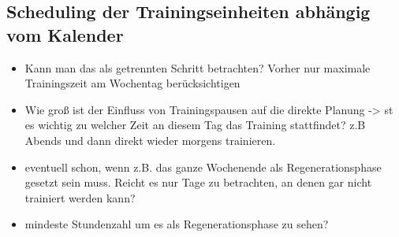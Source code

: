 \subsection{Scheduling der Trainingseinheiten abhängig vom Kalender}
    \begin{itemize}
        \item Kann man das als getrennten Schritt betrachten? Vorher nur maximale Trainingszeit am Wochentag berücksichtigen
        \item Wie groß ist der Einfluss von Trainingspausen auf die direkte Planung -> st es wichtig zu welcher Zeit an diesem Tag das Training stattfindet? z.B Abends und dann direkt wieder morgens trainieren. 
        \item eventuell schon, wenn z.B. das ganze Wochenende als Regenerationsphase gesetzt sein muss. Reicht es nur Tage zu betrachten, an denen gar nicht trainiert werden kann? 
        \item mindeste Stundenzahl um es als Regenerationsphase zu sehen?
    \end{itemize}

